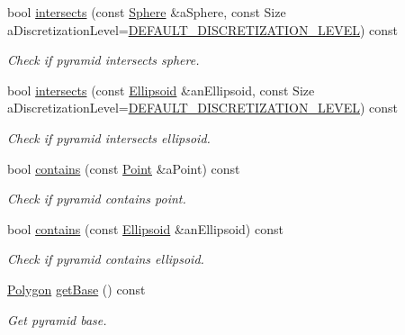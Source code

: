 \begin{DoxyCompactItemize}
bool \hyperlink{classostk_1_1math_1_1geom_1_1d3_1_1objects_1_1_pyramid_afec0e69f5caed5b0b676d70f414142dd}{intersects} (const \hyperlink{classostk_1_1math_1_1geom_1_1d3_1_1objects_1_1_sphere}{Sphere} \&a\+Sphere, const Size a\+Discretization\+Level=\hyperlink{_pyramid_8hpp_a3eb9931e85ba4c9718113211e549e91d}{D\+E\+F\+A\+U\+L\+T\+\_\+\+D\+I\+S\+C\+R\+E\+T\+I\+Z\+A\+T\+I\+O\+N\+\_\+\+L\+E\+V\+EL}) const
\begin{DoxyCompactList}\small\item\em Check if pyramid intersects sphere. \end{DoxyCompactList}\item 
bool \hyperlink{classostk_1_1math_1_1geom_1_1d3_1_1objects_1_1_pyramid_a807b60d75b73a97647cb41866c31e672}{intersects} (const \hyperlink{classostk_1_1math_1_1geom_1_1d3_1_1objects_1_1_ellipsoid}{Ellipsoid} \&an\+Ellipsoid, const Size a\+Discretization\+Level=\hyperlink{_pyramid_8hpp_a3eb9931e85ba4c9718113211e549e91d}{D\+E\+F\+A\+U\+L\+T\+\_\+\+D\+I\+S\+C\+R\+E\+T\+I\+Z\+A\+T\+I\+O\+N\+\_\+\+L\+E\+V\+EL}) const
\begin{DoxyCompactList}\small\item\em Check if pyramid intersects ellipsoid. \end{DoxyCompactList}\item 
bool \hyperlink{classostk_1_1math_1_1geom_1_1d3_1_1objects_1_1_pyramid_a7f476c37cc3f014bdc24e7fa4f2da743}{contains} (const \hyperlink{classostk_1_1math_1_1geom_1_1d3_1_1objects_1_1_point}{Point} \&a\+Point) const
\begin{DoxyCompactList}\small\item\em Check if pyramid contains point. \end{DoxyCompactList}\item 
bool \hyperlink{classostk_1_1math_1_1geom_1_1d3_1_1objects_1_1_pyramid_a761592bada278f4a80f910e3e234fde8}{contains} (const \hyperlink{classostk_1_1math_1_1geom_1_1d3_1_1objects_1_1_ellipsoid}{Ellipsoid} \&an\+Ellipsoid) const
\begin{DoxyCompactList}\small\item\em Check if pyramid contains ellipsoid. \end{DoxyCompactList}\item 
\hyperlink{classostk_1_1math_1_1geom_1_1d3_1_1objects_1_1_polygon}{Polygon} \hyperlink{classostk_1_1math_1_1geom_1_1d3_1_1objects_1_1_pyramid_ae1f35fb024a1cd171b750170cb1df0a4}{get\+Base} () const
\begin{DoxyCompactList}\small\item\em Get pyramid base. \end{DoxyCompactList}\item 

\end{DoxyCompactItemize}
